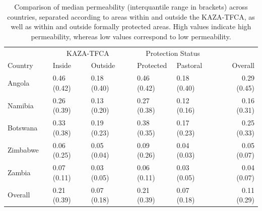 \documentclass[abstract=on,10pt,a4paper,bibliography=totocnumbered]{scrartcl}
\begin{document}
\begin{table}[h]
  \caption{Comparison of median permeability (interquantile range in brackets)
  across countries, separated according to areas within and outside the
  KAZA-TFCA, as well as within and outside formally protected areas. High values
  indicate high permeability, whereas low values correspond to low
  permeability.}
  \label{PermeabilityComp}
  \begin{center}
    \resizebox{0.9\textwidth}{!} {
      \begin{tabular}{llllllllr}
      & & \multicolumn{2}{c}{KAZA-TFCA} && \multicolumn{2}{c}{Protection Status} \\
      \cline{3-4} \cline{6-7}
      Country & & Inside & Outside & & Protected & Pastoral & & Overall \\
      \hline
      Angola & & 0.46 (0.42) & 0.18 (0.40) & & 0.46 (0.42) & 0.18 (0.40) & & 0.29 (0.45) \\
      Namibia & & 0.26 (0.39) & 0.13 (0.20) & & 0.27 (0.38) & 0.12 (0.16) & & 0.16 (0.31) \\
      Botswana & & 0.33 (0.38) & 0.19 (0.23) & & 0.38 (0.35) & 0.17 (0.23) & & 0.25 (0.33) \\
      Zimbabwe & & 0.06 (0.25) & 0.05 (0.04) & & 0.09 (0.26) & 0.04 (0.03) & & 0.05 (0.07) \\
      Zambia & & 0.07 (0.11) & 0.03 (0.05) & & 0.06 (0.11) & 0.03 (0.05) & & 0.04 (0.07) \\
      \hline
      Overall & & 0.21 (0.39) & 0.07 (0.18) & & 0.21 (0.39) & 0.07 (0.18) & & 0.11 (0.29) \\
      \end{tabular}
    }
  \end{center}
\end{table}
\end{document}
